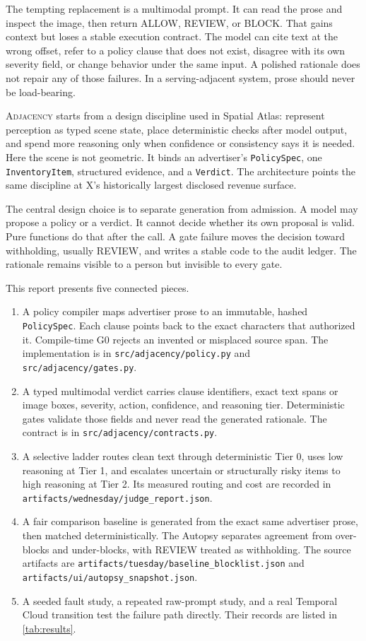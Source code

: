 \documentclass{article}
\newcommand{\artifact}[1]{\nolinkurl{#1}}
\newcommand{\code}[1]{\texttt{#1}}
\newcommand{\Adj}{\textsc{Adjacency}\xspace}
\begin{document}
The tempting replacement is a multimodal prompt. It can read the prose and inspect the image, then
return ALLOW, REVIEW, or BLOCK. That gains context but loses a stable execution contract. The model
can cite text at the wrong offset, refer to a policy clause that does not exist, disagree with its
own severity field, or change behavior under the same input. A polished rationale does not repair
any of those failures. In a serving-adjacent system, prose should never be load-bearing.

\Adj starts from a design discipline used in Spatial Atlas: represent perception as typed scene
state, place deterministic checks after model output, and spend more reasoning only when confidence
or consistency says it is needed. Here the scene is not geometric. It binds an advertiser's
\code{PolicySpec}, one \code{InventoryItem}, structured evidence, and a \code{Verdict}. The
architecture points the same discipline at X's historically largest disclosed revenue surface.

The central design choice is to separate generation from admission. A model may propose a policy or
a verdict. It cannot decide whether its own proposal is valid. Pure functions do that after the
call. A gate failure moves the decision toward withholding, usually REVIEW, and writes a stable code
to the audit ledger. The rationale remains visible to a person but invisible to every gate.

 This report presents five connected pieces.

\begin{enumerate}
  \item A policy compiler maps advertiser prose to an immutable, hashed \code{PolicySpec}. Each
  clause points back to the exact characters that authorized it. Compile-time G0 rejects an
  invented or misplaced source span. The implementation is in \artifact{src/adjacency/policy.py}
  and \artifact{src/adjacency/gates.py}.
  \item A typed multimodal verdict carries clause identifiers, exact text spans or image boxes,
  severity, action, confidence, and reasoning tier. Deterministic gates validate those fields and
  never read the generated rationale. The contract is in
  \artifact{src/adjacency/contracts.py}.
  \item A selective ladder routes clean text through deterministic Tier 0, uses low reasoning at
  Tier 1, and escalates uncertain or structurally risky items to high reasoning at Tier 2. Its
  measured routing and cost are recorded in
  \artifact{artifacts/wednesday/judge_report.json}.
  \item A fair comparison baseline is generated from the exact same advertiser prose, then matched
  deterministically. The Autopsy separates agreement from over-blocks and under-blocks, with REVIEW
  treated as withholding. The source artifacts are
  \artifact{artifacts/tuesday/baseline_blocklist.json} and
  \artifact{artifacts/ui/autopsy_snapshot.json}.
  \item A seeded fault study, a repeated raw-prompt study, and a real Temporal Cloud transition test
  the failure path directly. Their records are listed in \cref{tab:results}.
\end{enumerate}
\end{document}
